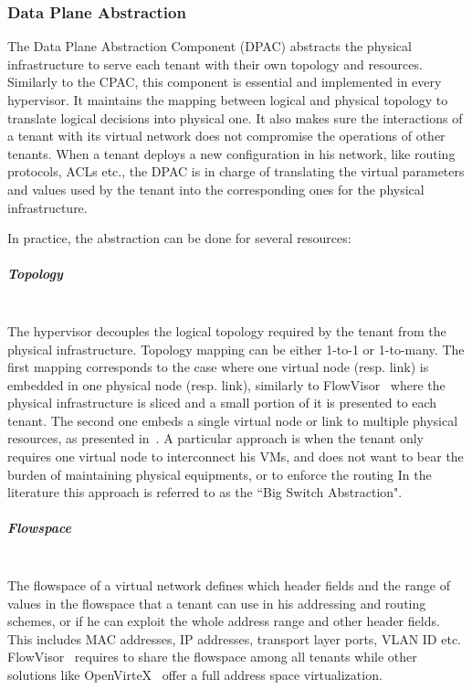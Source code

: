 \subsubsection{Data Plane Abstraction}
\label{sec:abstraction_comp}
The Data Plane Abstraction Component (DPAC) abstracts the physical infrastructure to serve each tenant with their own topology and resources.
Similarly to the CPAC, this component is essential and implemented in every hypervisor.
It maintains the mapping between logical and physical topology to translate logical decisions into physical one.
It also makes sure the interactions of a tenant with its virtual network does not compromise the operations of other tenants. When a tenant deploys a new configuration in his network, like routing protocols, ACLs etc., the DPAC is in charge of translating the virtual parameters and values used by the tenant into the corresponding ones for the physical infrastructure.

In practice, the abstraction can be done for several resources:

\subparagraph{\textbf{Topology}}\textbf{}\\
The hypervisor decouples the logical topology required by the tenant from the physical infrastructure.
Topology mapping can be either 1-to-1 or 1-to-many. 
The first mapping corresponds to the case where one virtual node (resp. link) is embedded in one physical node (resp. link), similarly to FlowVisor~\cite{FlowVisor-Sherwood2009} where the physical infrastructure is sliced and a small portion of it is presented to each tenant.
The second one embeds a single virtual node or link to multiple physical resources, as presented in~\cite{OpenVirteX-Al-Shabibi2014,VeRTIGO-Corin2012a}.
A particular approach is when the tenant only requires one virtual node to interconnect his VMs, and does not want to bear the burden of maintaining physical equipments, or to enforce the routing \etc In the literature this approach is referred to as the ``Big Switch Abstraction".


\subparagraph{\textbf{Flowspace}}\textbf{}\\
The flowspace of a virtual network defines which header fields and the range of values in the flowspace that a tenant can use in his addressing and routing schemes, or if he can exploit the whole address range and other header fields.
This includes MAC addresses, IP addresses, transport layer ports, VLAN ID etc.
FlowVisor~\cite{FlowVisor-Sherwood2009} requires to share the flowspace among all tenants while other solutions like OpenVirteX~\cite{OpenVirteX-Al-Shabibi2014} offer a full address space virtualization.

